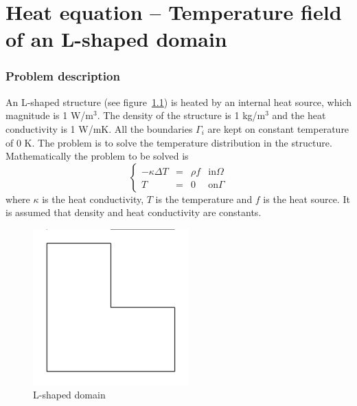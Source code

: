 \chapter{Heat equation -- Temperature field of an L-shaped domain}


\subsection*{Problem description}

An L-shaped structure 
(see figure~\ref{fg:struct1}) 
is heated by an
internal heat source, which magnitude is 1 W/m$^3$. The density of the
structure is 1 kg/m$^3$ and the heat conductivity is 1 W/mK. All the
boundaries $\Gamma_i$ are kept on constant temperature of 0 K. The
problem is to solve the temperature distribution in the structure.
Mathematically the problem to be solved is
\begin{equation}
\left \{
\begin{array}{cccc}
- \kappa \Delta T &= &\rho f & \mathrm{ in } \Omega \\
T&=&0 & \mathrm{ on } \Gamma
\end{array}
\right .
\end{equation}
where $\kappa$ is the heat conductivity, $T$  is the temperature 
and $f$ is the heat source. It is assumed that density 
and heat conductivity are constants. 

\begin{figure}
\begin{center}
\includegraphics[width=60mm, viewport=20 20 580 580,clip]{angle}
\caption{L-shaped domain}\label{fg:struct1}
\end{center}
\end{figure}

